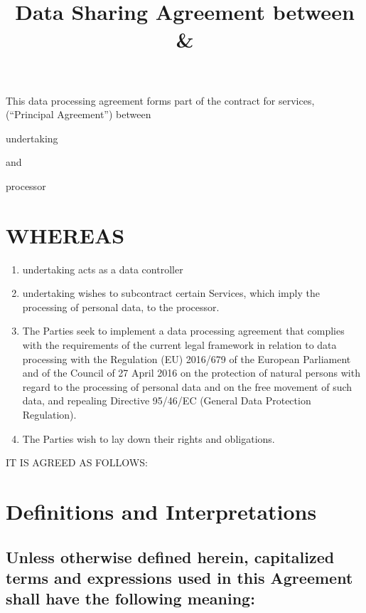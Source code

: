 \documentclass[a4paper]{article}
\title{Data Sharing Agreement between \Glsentrytext{undertaking} \& \Glsentrytext{processor}}
\begin{document}
\maketitle


This data processing agreement forms part of the contract for services, (``Principal Agreement'') between

\vspace{2em}

\Gls{undertaking}

\vspace{2em}

and

\vspace{2em}

\Gls{processor}

\vspace{2em}

\section*{WHEREAS}

\begin{enumerate}

	\item{\Gls{undertaking} acts as a data controller}
	\item{\Gls{undertaking} wishes to subcontract certain Services, which imply the processing of personal data, to the \gls{processor}.}
	\item{The Parties seek to implement a data processing agreement that complies with the requirements of the current legal framework in relation to data processing with the Regulation (EU) 2016/679 of the European Parliament and of the Council of 27 April 2016 on the protection of natural persons with regard to the processing of personal data and on the free movement of such data, and repealing Directive 95/46/EC (General Data Protection Regulation).}
	\item{The Parties wish to lay down their rights and obligations.}

\end{enumerate}

IT IS AGREED AS FOLLOWS:

\section{Definitions and Interpretations}

\subsection{Unless otherwise defined herein, capitalized terms and expressions used in this Agreement shall have the following meaning:}
\end{document}

